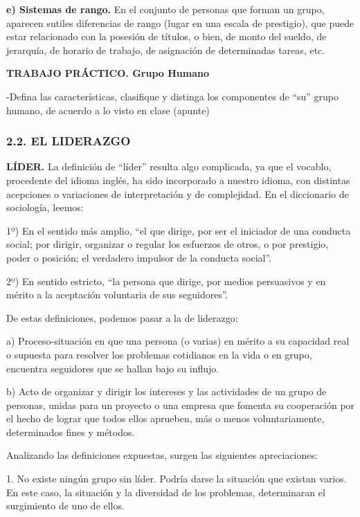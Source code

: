 \textbf{e) Sistemas de rango. }En el conjunto de personas que forman un grupo, aparecen sutiles diferencias de rango (lugar en una escala de prestigio), que puede estar relacionado con la posesión de títulos, o bien, de monto del sueldo, de jerarquía, de horario de trabajo, de asignación de determinadas tareas, etc.

\textbf{TRABAJO PRÁCTICO. Grupo Humano}

-Defina las características, clasifique y distinga los componentes de “su” grupo humano, de acuerdo a lo visto en clase (apunte)



\subsubsection*{2.2. EL LIDERAZGO}
\textbf{LÍDER. }La definición de “líder” resulta algo complicada, ya que el vocablo, procedente del idioma inglés, ha sido incorporado a nuestro idioma, con distintas acepciones o variaciones de interpretación y de complejidad. En el diccionario de sociología, leemos:

1º) En el sentido más amplio, “el que dirige, por ser el iniciador de una conducta social; por dirigir, organizar o regular los esfuerzos de otros, o por prestigio, poder o posición; el verdadero impulsor de la conducta social”.

2º) En sentido estricto, “la persona que dirige, por medios persuasivos y en mérito a la aceptación voluntaria de sus seguidores”.

De estas definiciones, podemos pasar a la de liderazgo:

a) Proceso-situación en que una persona (o varias) en mérito a su capacidad real o supuesta para resolver los problemas cotidianos en la vida o en grupo, encuentra seguidores que se hallan bajo su influjo.

b) Acto de organizar y dirigir los intereses y las actividades de un grupo de personas, unidas para un proyecto o una empresa que fomenta su cooperación por el hecho de lograr que todos ellos aprueben, más o menos voluntariamente, determinados fines y métodos.

Analizando las definiciones expuestas, surgen las siguientes apreciaciones:

1. No existe ningún grupo sin líder. Podría darse la situación que existan varios. En este caso, la situación y la diversidad de los problemas, determinaran el surgimiento de uno de ellos.

